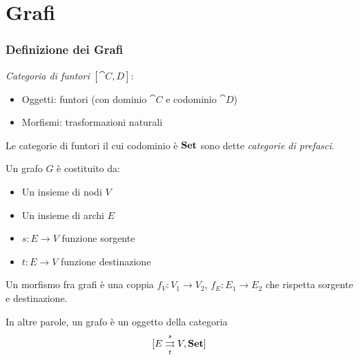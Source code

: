\documentclass[8pt]{beamer}
\begin{document}
\section{Grafi}

\begin{frame}[fragile]\frametitle{Definizione dei Grafi}

	\emph{Categoria di funtori} $[\cat{C, D}]$:
	\begin{itemize}
		\item Oggetti: funtori (con dominio $\cat C$ e codominio $\cat D$)
		\item Morfismi: trasformazioni naturali
	\end{itemize}
	
	\smallskip

	    Le categorie di funtori il cui codominio \`e $\mathbf{Set}$ sono dette \emph{categorie di prefasci}.

	    \smallskip


	Un grafo $G$ \`e costituito da:
	\begin{itemize}
		\item Un insieme di nodi $V$
		\item Un insieme di archi $E$
		\item $s: E \to V$ funzione sorgente
		\item $t: E \to V$ funzione destinazione
	\end{itemize}
	Un morfismo fra grafi \`e una coppia $f_V: V_1 \to V_2$, $f_E: E_1 \to E_2$ che rispetta sorgente e destinazione.
	
	    \smallskip
	
	In altre parole, un grafo \`e un oggetto della categoria $$[E \mathrel{\mathop{\rightrightarrows}^{s}_{t}} V , \mathbf{Set}]$$
\end{frame}
\end{document}
